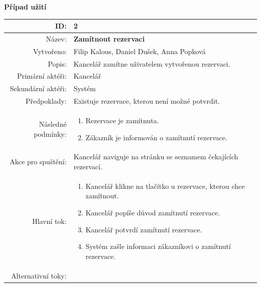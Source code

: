 \newpage
\textbf{Případ užití }
\begin{center}
\begin{table}[ht!]
{\renewcommand{\arraystretch}{1.3}
\begin{tabular}{| r | p{12cm} |}
	\hline
	ID: & 2 \\
    \hline
    Název: & \textbf{Zamítnout rezervaci} \\
    \hline
    Vytvořeno: & Filip Kalous, Daniel Dušek, Anna Popková \\
    \hline
    Popis: & Kancelář zamítne uživatelem vytvořenou rezervaci. \\
    \hline
    Primární aktéři: & Kancelář \\
    \hline
    Sekundární aktéři: & Systém \\
    \hline
    Předpoklady: & Existuje rezervace, kterou není možné potvrdit. \\
    \hline
    Následné podmínky: & 
    \begin{minipage}[t]{0.75\textwidth}
    	\begin{enumerate}[nosep,after=\strut]
    		\item Rezervace je zamítnuta.
            \item Zákazník je informován o zamítnutí rezervace.
    	\end{enumerate}
  	\end{minipage} \\
	\hline
    Akce pro spuštění: &  Kancelář naviguje na stránku se seznamem čekajících rezervací. \\
    \hline
    Hlavní tok: & 
    \begin{minipage}[t]{0.75\textwidth}
    	\begin{enumerate}[nosep,after=\strut]
    		\item Kancelář klikne na tlačítko \uv{Zamítnout rezervaci} u rezervace, kterou chce zamítnout.
            \item Kancelář popíše důvod zamítnutí rezervace.
            \item Kancelář potvrdí zamítnutí rezervace.
            \item Systém zašle informaci zákazníkovi o zamítnutí rezervace.
    	\end{enumerate}
  	\end{minipage} \\
    \hline
    Alternativní toky: & \\
    \hline

\end{tabular}}
\end{table}
\end{center}
